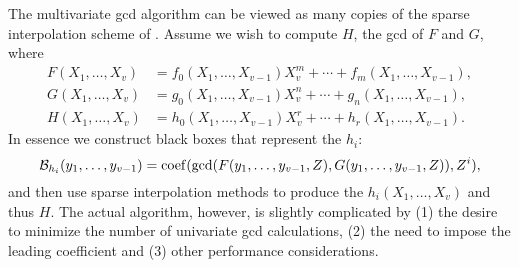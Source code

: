 The multivariate {\sc gcd} algorithm can be viewed as many copies of
the sparse interpolation scheme of .
Assume we wish to compute $H$, the {\sc gcd} of $F$ and $G$, where
\[
\begin{aligned}
F(X_1, \ldots, X_v) & = f_0(X_1, \ldots, X_{v-1}) X_v^m + \cdots + f_m(X_1,
\ldots, X_{v-1}), \\
G(X_1, \ldots, X_v) & = g_0(X_1, \ldots, X_{v-1}) X_v^n + \cdots + g_n(X_1,
\ldots, X_{v-1}), \\
H(X_1, \ldots, X_v) & = h_0(X_1, \ldots, X_{v-1}) X_v^r + \cdots + h_r(X_1,
\ldots, X_{v-1}).
\end{aligned}
\]
In essence we construct black boxes that represent the $h_i$:
\[
{\cal B}_{h_i}(y_1, \ldots, y_{v-1}) 
  = \operatorname{coef}(\gcd(F(y_1, \ldots, y_{v-1}, Z), G(y_1, \ldots, y_{v-1}, Z)), Z^i),
\]
and then use sparse interpolation methods to produce the $h_i(X_1,
\ldots, X_v)$ and thus $H$.  The actual algorithm, however, is
slightly complicated by (1) the desire to minimize the number of
univariate {\sc gcd} calculations, (2) the need to impose the leading
coefficient and (3) other performance considerations.

